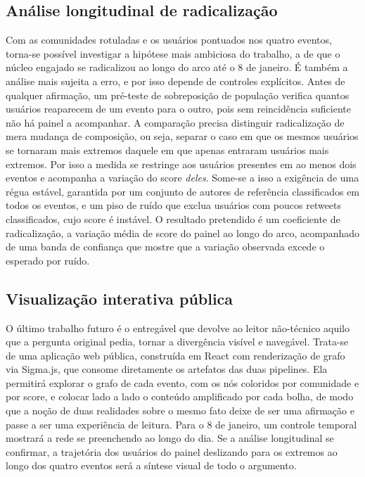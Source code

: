 \documentclass[conference]{IEEEtran}
\begin{document}
\subsection{Análise longitudinal de radicalização}
\label{sub:fut-radicalizacao}

Com as comunidades rotuladas e os usuários pontuados nos quatro eventos, torna-se possível investigar a hipótese mais ambiciosa do trabalho, a de que o núcleo engajado se radicalizou ao longo do arco até o 8 de janeiro. É também a análise mais sujeita a erro, e por isso depende de controles explícitos. Antes de qualquer afirmação, um pré-teste de sobreposição de população verifica quantos usuários reaparecem de um evento para o outro, pois sem reincidência suficiente não há painel a acompanhar. A comparação precisa distinguir radicalização de mera mudança de composição, ou seja, separar o caso em que os mesmos usuários se tornaram mais extremos daquele em que apenas entraram usuários mais extremos. Por isso a medida se restringe aos usuários presentes em ao menos dois eventos e acompanha a variação do score \emph{deles}. Some-se a isso a exigência de uma régua estável, garantida por um conjunto de autores de referência classificados em todos os eventos, e um piso de ruído que exclua usuários com poucos retweets classificados, cujo score é instável. O resultado pretendido é um coeficiente de radicalização, a variação média de score do painel ao longo do arco, acompanhado de uma banda de confiança que mostre que a variação observada excede o esperado por ruído.

\subsection{Visualização interativa pública}
\label{sub:fut-visualizacao}

O último trabalho futuro é o entregável que devolve ao leitor não-técnico aquilo que a pergunta original pedia, tornar a divergência visível e navegável. Trata-se de uma aplicação web pública, construída em React com renderização de grafo via Sigma.js, que consome diretamente os artefatos das duas pipelines. Ela permitirá explorar o grafo de cada evento, com os nós coloridos por comunidade e por score, e colocar lado a lado o conteúdo amplificado por cada bolha, de modo que a noção de duas realidades sobre o mesmo fato deixe de ser uma afirmação e passe a ser uma experiência de leitura. Para o 8 de janeiro, um controle temporal mostrará a rede se preenchendo ao longo do dia. Se a análise longitudinal se confirmar, a trajetória dos usuários do painel deslizando para os extremos ao longo dos quatro eventos será a síntese visual de todo o argumento.
\end{document}
